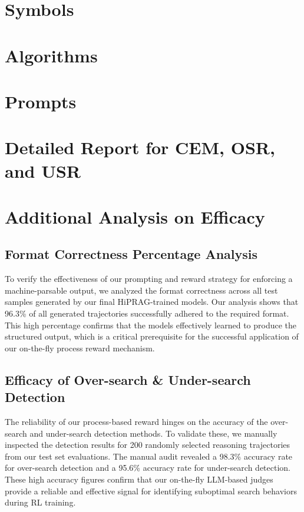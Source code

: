 \documentclass{article}
\begin{document}
\clearpage
\section{Symbols}


\section{Algorithms}


\clearpage
\section{Prompts}




\clearpage
\section{Detailed Report for CEM, OSR, and USR}
\label{sec:detailed_report_cem_osr_usr}


\section{Additional Analysis on Efficacy}
\label{sec:additional_analysis_on_efficacy}
\subsection{Format Correctness Percentage Analysis}
To verify the effectiveness of our prompting and reward strategy for enforcing a machine-parsable output, we analyzed the format correctness across all test samples generated by our final HiPRAG-trained models. Our analysis shows that 96.3\% of all generated trajectories successfully adhered to the required format. This high percentage confirms that the models effectively learned to produce the structured output, which is a critical prerequisite for the successful application of our on-the-fly process reward mechanism.

\subsection{Efficacy of Over-search \& Under-search Detection}
The reliability of our process-based reward hinges on the accuracy of the over-search and under-search detection methods. To validate these, we manually inspected the detection results for 200 randomly selected reasoning trajectories from our test set evaluations. The manual audit revealed a 98.3\% accuracy rate for over-search detection and a 95.6\% accuracy rate for under-search detection. These high accuracy figures confirm that our on-the-fly LLM-based judges provide a reliable and effective signal for identifying suboptimal search behaviors during RL training.
\end{document}
